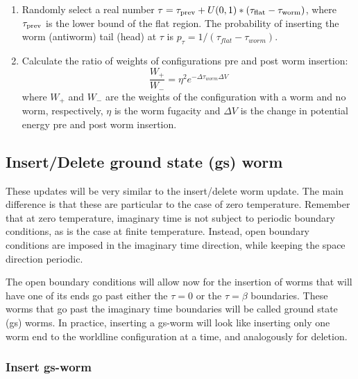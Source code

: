 \documentclass[12pt, two sided]{article}
\begin{document}
\begin{enumerate}
        \item Randomly select a real number $\tau = \tau_{\rm{prev}} + U(0,1)*(\tau_{\rm{flat}}-\tau_{\rm{worm}})$, where $\tau_{\rm{prev}}$ is the lower bound of the flat region. The probability of inserting the worm (antiworm) tail (head) at $\tau$ is $p_{\tau} = 1/(\tau_{flat} - \tau_{worm})$.
        \item Calculate the ratio of weights of configurations pre and post worm insertion:
            \begin{equation}
            \frac{W_+}{W_-} = \eta^2 e^{-\Delta\tau_{worm} \Delta V}
            \label{eq:insert_ratios}
            \end{equation}
            where $W_+$ and $W_-$ are the weights of the configuration with a worm and no worm, respectively, $\eta$ is the worm fugacity and $\Delta V$ is the change in potential energy pre and post worm insertion. 
    \end{enumerate}

    \subsection{Insert/Delete ground state (gs) worm}
    These updates will be very similar to the insert/delete worm update. The main difference is that these are particular to the case of zero temperature. Remember that at zero temperature, imaginary time is not subject to periodic boundary conditions, as is the case at finite temperature. Instead, open boundary conditions are imposed in the imaginary time direction, while keeping the space direction periodic. 

    The open boundary conditions will allow now for the insertion of worms that will have one of its ends go past either the $\tau = 0$ or the $\tau = \beta$ boundaries. These worms that go past the imaginary time boundaries will be called ground state (gs) worms. In practice, inserting a gs-worm will look like inserting only one worm end to the worldline configuration at a time, and analogously for deletion. 

    \subsubsection{Insert gs-worm}
\end{document}
